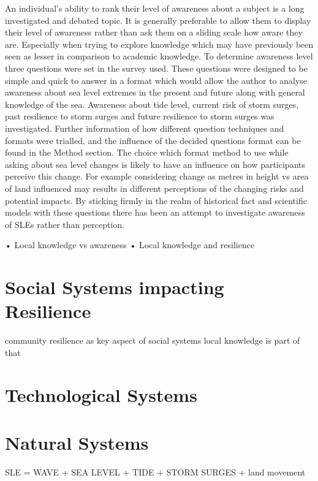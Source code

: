 \documentclass{article}
\begin{document}
An individual’s ability to rank their level of awareness about a subject is a long investigated and debated topic. It is generally preferable to allow them to display their level of awareness rather than ask them on a sliding scale how aware they are. Especially when trying to explore knowledge which may have previously been seen as lesser in comparison to academic knowledge. 
To determine awareness level three questions were set in the survey used. These questions were designed to be simple and quick to answer in a format which would allow the author to analyse awareness about sea level extremes in the present and future along with general knowledge of the sea. 
Awareness about tide level, current risk of storm surges, past resilience to storm surges and future resilience to storm surges was investigated. Further information of how different question techniques and formats were trialled, and the influence of the decided questions format can be found in the Method section. The choice which format method to use while asking about sea level changes is likely to have an influence on how participants perceive this change. For example considering change as metres in height vs area of land influenced may results in different perceptions of the changing risks and potential impacts.  By sticking firmly in the realm of historical fact and scientific models with these questions there has been an attempt to investigate awareness of SLEs rather than perception. 

•	Local knowledge vs awareness
•	Local knowledge and resilience 

\section{Social Systems impacting Resilience}
community resilience as key aspect of social systems
local knowledge is part of that

\section{Technological Systems}

\section{Natural Systems }
SLE = WAVE + SEA LEVEL + TIDE + STORM SURGES + land movement
\end{document}
